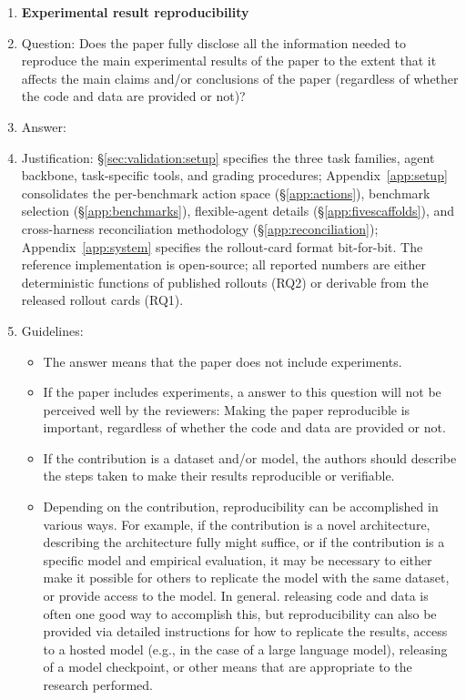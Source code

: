 \begin{enumerate}
    \item {\bf Experimental result reproducibility}
    \item[] Question: Does the paper fully disclose all the information needed to reproduce the main experimental results of the paper to the extent that it affects the main claims and/or conclusions of the paper (regardless of whether the code and data are provided or not)?
    \item[] Answer: \answerYes{}
    \item[] Justification: \S\ref{sec:validation:setup} specifies the three task families, agent backbone, task-specific tools, and grading procedures; Appendix~\ref{app:setup} consolidates the per-benchmark action space (\S\ref{app:actions}), benchmark selection (\S\ref{app:benchmarks}), flexible-agent details (\S\ref{app:fivescaffolds}), and cross-harness reconciliation methodology (\S\ref{app:reconciliation}); Appendix~\ref{app:system} specifies the rollout-card format bit-for-bit. The reference implementation is open-source; all reported numbers are either deterministic functions of published rollouts (RQ2) or derivable from the released rollout cards (RQ1).
    \item[] Guidelines:
    \begin{itemize}
        \item The answer \answerNA{} means that the paper does not include experiments.
        \item If the paper includes experiments, a \answerNo{} answer to this question will not be perceived well by the reviewers: Making the paper reproducible is important, regardless of whether the code and data are provided or not.
        \item If the contribution is a dataset and\slash or model, the authors should describe the steps taken to make their results reproducible or verifiable.
        \item Depending on the contribution, reproducibility can be accomplished in various ways. For example, if the contribution is a novel architecture, describing the architecture fully might suffice, or if the contribution is a specific model and empirical evaluation, it may be necessary to either make it possible for others to replicate the model with the same dataset, or provide access to the model. In general. releasing code and data is often one good way to accomplish this, but reproducibility can also be provided via detailed instructions for how to replicate the results, access to a hosted model (e.g., in the case of a large language model), releasing of a model checkpoint, or other means that are appropriate to the research performed.

\end{itemize}
\end{enumerate}
